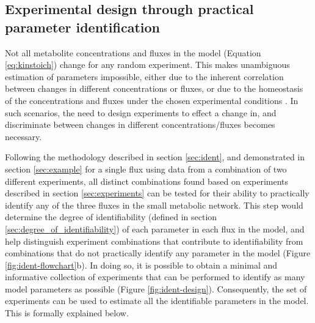 \documentclass[10pt]{article}
\begin{document}
	\subsection{Experimental design through practical parameter identification}\label{sec:experimental_design}	
	
	Not all metabolite concentrations and fluxes in the model (Equation \ref{eq:kinstoich}) change for any random experiment. This makes unambiguous estimation of parameters impossible, either due to the inherent correlation between changes in different concentrations or fluxes, or due to the homeostasis of the concentrations and fluxes under the chosen experimental conditions \parencite{Heijnen2013}. In such scenarios, the need to design experiments to effect a change in, and discriminate between changes in different concentrations/fluxes becomes necessary. 
		
	Following the methodology described in section \ref{sec:ident}, and demonstrated in section \ref{sec:example} for a single flux using data from a combination of two different experiments, all distinct combinations found based on experiments described in section \ref{sec:experiments} can be tested for their ability to practically identify any of the three fluxes in the small metabolic network. This step would determine the degree of identifiability (defined in section \ref{sec:degree_of_identifiability}) of each parameter in each flux in the model, and help distinguish experiment combinations that contribute to identifiability from combinations that do not practically identify any parameter in the model (Figure \ref{fig:ident-flowchart}b). In doing so, it is possible to obtain a minimal and informative collection of experiments that can be performed to identify as many model parameters as possible (Figure \ref{fig:ident-design}). Consequently, the set of experiments can be used to estimate all the identifiable parameters in the model. This is formally explained below.
	
\end{document}
